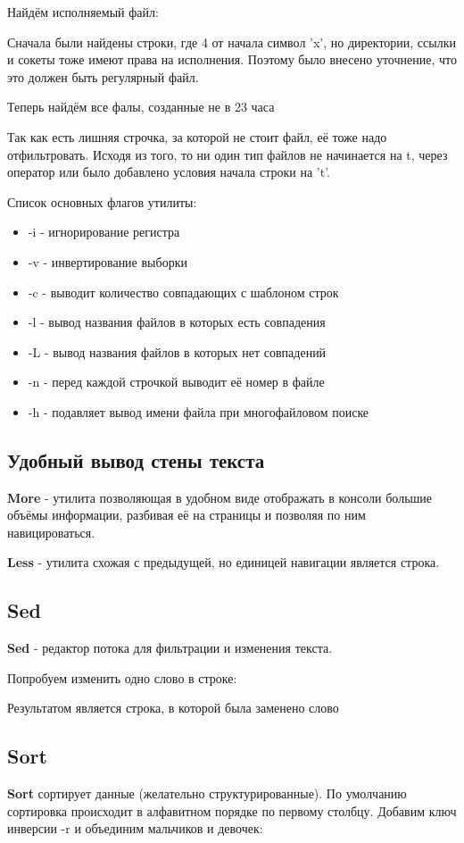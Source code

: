 \documentclass[a4paper]{article}
\begin{document}
Найдём исполняемый файл:

Сначала были найдены строки, где 4 от начала символ 'x', но директории, ссылки и сокеты тоже имеют права на исполнения. Поэтому было внесено уточнение, что это должен быть регулярный файл.

Теперь найдём все фалы, созданные не в 23 часа

Так как есть лишняя строчка, за которой не стоит файл, её тоже надо отфильтровать. Исходя из того, то ни один тип файлов не начинается на t, через оператор или было добавлено условия начала строки на 't'.

Список основных флагов утилиты:
\begin{itemize}
\item -i - игнорирование регистра
\item -v - инвертирование выборки
\item -c - выводит количество совпадающих с шаблоном строк
\item -l - вывод названия файлов в которых есть совпадения
\item -L - вывод названия файлов в которых нет совпадений
\item -n - перед каждой строчкой выводит её номер в файле
\item -h - подавляет вывод имени файла при многофайловом поиске
\end{itemize}
\subsection{ Удобный вывод стены текста}  
\textbf{More} - утилита позволяющая в удобном виде отображать в консоли большие объёмы информации, разбивая её на страницы и позволяя по ним навицироваться.

\textbf{Less} - утилита схожая с предыдущей, но единицей навигации является строка.
\subsection{Sed}
\textbf{Sed} - редактор потока для фильтрации и изменения текста.

Попробуем изменить одно слово в строке:

Результатом является строка, в которой была заменено слово

\subsection{Sort}
\textbf{Sort} сортирует данные (желательно структурированные). По умолчанию сортировка происходит в алфавитном порядке по первому столбцу.
Добавим ключ инверсии -r и объединим мальчиков и девочек:

\end{document}
